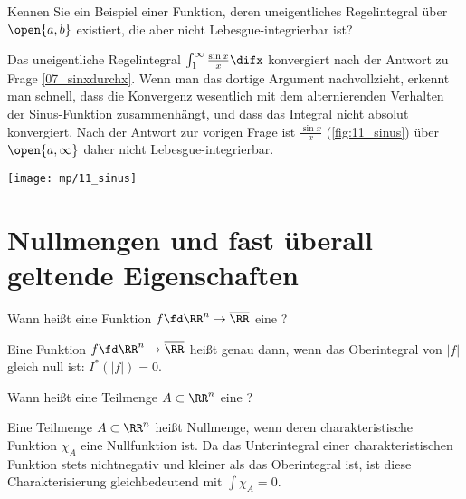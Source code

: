 \begin{frage}
  Kennen Sie ein Beispiel einer Funktion, deren uneigentliches Regelintegral 
  über $\open{a,b}$ existiert, die aber nicht Lebesgue-integrierbar ist?
\end{frage}

\begin{antwort}
  Das uneigentliche Regelintegral $\int_1^\infty \frac{\sin x}{x} \difx$ 
  konvergiert nach der Antwort zu Frage \ref{07_sinxdurchx}. 
  Wenn man das dortige Argument nachvollzieht, erkennt man schnell, dass 
  die Konvergenz wesentlich mit dem alternierenden Verhalten der Sinus-Funktion 
  zusammenhängt, und dass das Integral nicht absolut konvergiert. 
  Nach der Antwort zur vorigen Frage ist $\frac{\sin x}{x}$ 
  (\sieheAbbildung \ref{fig:11_sinus}) über 
  $\open{a,\infty}$ daher nicht Lebesgue-integrierbar. 

  \begin{center}
    \texttt{[image: mp/11\_sinus]}
    \label{fig:11_sinus}
  \end{center} 

  \vspace*{-3mm}
\end{antwort}




\section{Nullmengen und fast überall geltende Eigenschaften}

\begin{frage}
  Wann hei{\ss}t eine Funktion 
  $f\fd \RR^n \to \overline{\RR}$ eine ?
\end{frage}

\begin{antwort}
  Eine Funktion $f\fd \RR^n \to \overline{\RR}$ hei{\ss}t 
   genau dann, wenn das Oberintegral 
  von $|f|$ gleich null ist: $I^*(|f|) = 0$.\AntEnd
\end{antwort}

\begin{frage}
  Wann hei{\ss}t eine Teilmenge $A\subset\RR^n$ eine ?
\end{frage}

\begin{antwort}
  Eine Teilmenge $A\subset\RR^n$ heißt Nullmenge, 
  wenn deren charakteristische 
  Funktion $\chi_A$ eine Nullfunktion ist. Da das Unterintegral einer 
  charakteristischen Funktion stets nichtnegativ und kleiner als 
  das Oberintegral ist, ist diese Charakterisierung gleichbedeutend mit 
  $\int \chi_A =0$.
  \AntEnd
\end{antwort}

